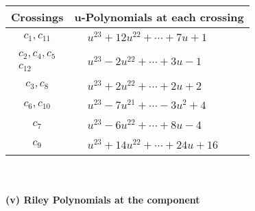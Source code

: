 \documentclass[1p]{elsarticle_modified}
\theoremstyle{definition}
\begin{document}
\begin{tabular}{m{50pt}|m{274pt}}
Crossings & \hspace{64pt}u-Polynomials at each crossing \\
\hline $$\begin{aligned}c_{1},c_{11}\end{aligned}$$&$\begin{aligned}
&u^{23}+12 u^{22}+\cdots+7 u+1
\end{aligned}$\\
\hline $$\begin{aligned}c_{2},c_{4},c_{5}\\c_{12}\end{aligned}$$&$\begin{aligned}
&u^{23}-2 u^{22}+\cdots+3 u-1
\end{aligned}$\\
\hline $$\begin{aligned}c_{3},c_{8}\end{aligned}$$&$\begin{aligned}
&u^{23}+2 u^{22}+\cdots+2 u+2
\end{aligned}$\\
\hline $$\begin{aligned}c_{6},c_{10}\end{aligned}$$&$\begin{aligned}
&u^{23}-7 u^{21}+\cdots-3 u^2+4
\end{aligned}$\\
\hline $$\begin{aligned}c_{7}\end{aligned}$$&$\begin{aligned}
&u^{23}-6 u^{22}+\cdots+8 u-4
\end{aligned}$\\
\hline $$\begin{aligned}c_{9}\end{aligned}$$&$\begin{aligned}
&u^{23}+14 u^{22}+\cdots+24 u+16
\end{aligned}$\\
\hline
\end{tabular}\\~\\
\newpage\renewcommand{\arraystretch}{1}
\flushleft \textbf{(v) Riley Polynomials at the component}\newline \\
\end{document}
